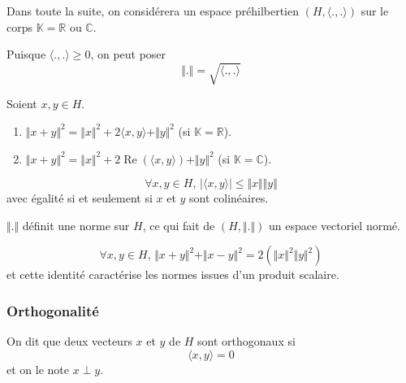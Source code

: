   Dans toute la suite, on considérera un espace préhilbertien $(H, \langle ., . \rangle)$ sur le corps $\mathbb{K} = \mathbb{R} \text{ ou } \mathbb{C}$.

  \begin{notation}
    Puisque $\langle ., . \rangle \geq 0$, on peut poser
    \[ \Vert . \Vert = \sqrt{\langle ., . \rangle} \]
  \end{notation}

  \begin{proposition}
    \label{213-1}
    Soient $x, y \in H$.
    \begin{enumerate}[label={\bfseries(\roman*)}]
      \item $\Vert x + y \Vert^2 = \Vert x \Vert^2 + 2 \langle x, y \rangle + \Vert y \Vert^2$ (si $\mathbb{K} = \mathbb{R}$).
      \item $\Vert x + y \Vert^2 = \Vert x \Vert^2 + 2 \operatorname{Re}(\langle x, y \rangle) + \Vert y \Vert^2$ (si $\mathbb{K} = \mathbb{C}$).
    \end{enumerate}
  \end{proposition}

  \begin{theorem}
    \[ \forall x, y \in H, \, \vert \langle x, y \rangle \vert \leq \Vert x \Vert \Vert y \Vert \]
    avec égalité si et seulement si $x$ et $y$ sont colinéaires.
  \end{theorem}

  \begin{corollary}
    $\Vert . \Vert$ définit une norme sur $H$, ce qui fait de $(H, \Vert . \Vert)$ un espace vectoriel normé.
  \end{corollary}


  \begin{proposition}
    \[ \forall x, y \in H, \, \Vert x + y \Vert^2 + \Vert x - y \Vert^2 = 2(\Vert x \Vert^2 \Vert y \Vert^2) \]
    et cette identité caractérise les normes issues d'un produit scalaire.
  \end{proposition}

  \subsubsection{Orthogonalité}


  \begin{definition}
    On dit que deux vecteurs $x$ et $y$ de $H$ sont orthogonaux si
    \[ \langle x, y \rangle = 0 \]
    et on le note $x \perp y$.
  \end{definition}

